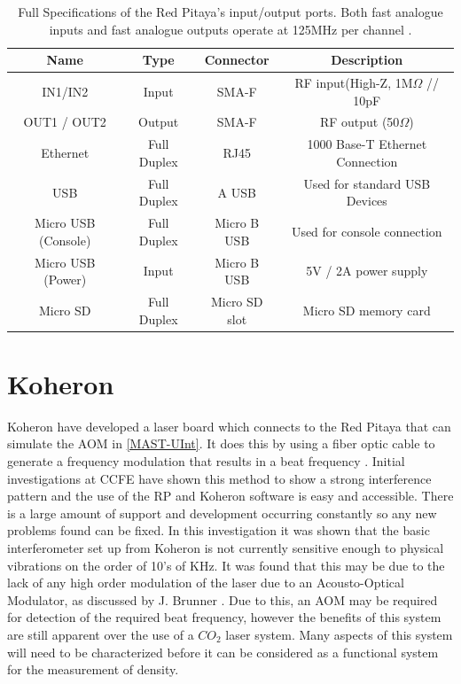 \documentclass[12pt,a4paper,oneside]{report}
\begin{document}
\begin{table}[H]
	\setlength\arrayrulewidth{1pt}
    \begin{tabular}{ c c c c } 
        Name & Type & Connector & Description\\
        \hline
        IN1/IN2 & Input & SMA-F & RF input(High-Z, 1M$\Omega$ // 10pF\\[1pt]
        OUT1 / OUT2 & Output & SMA-F & RF output (50$\Omega$)\\[1pt]
        Ethernet & Full Duplex & RJ45 & 1000 Base-T Ethernet Connection\\[1pt]
        USB & Full Duplex & A USB & Used for standard USB Devices\\[1pt]
        Micro USB (Console) & Full Duplex & Micro B USB & Used for console connection\\[1pt]
        Micro USB (Power) & Input & Micro B USB & 5V / 2A power supply\\[1pt]
        Micro SD & Full Duplex & Micro SD slot & Micro SD memory card\\
    \end{tabular}
    \caption{Full Specifications of the Red Pitaya's input/output ports. Both fast analogue inputs and fast analogue outputs operate at 125MHz per channel \cite[p.~7]{Leban2014RedManual}.}
    \label{RPspec}
\end{table}

\section{Koheron} 
Koheron have developed a laser board which connects to the Red Pitaya that can simulate the AOM in \autoref{MAST-UInt}. It does this by using a fiber optic cable to generate a frequency modulation that results in a beat frequency \cite{KoheronAmplitudeKoheron}. Initial investigations at CCFE \cite{Hickling2017InvestigationMAST-U} have shown this method to show a strong interference pattern and the use of the RP and Koheron software is easy and accessible. There is a large amount of support and development occurring constantly so any new problems found can be fixed. In this investigation it was shown that the basic interferometer set up from Koheron is not currently sensitive enough to physical vibrations on the order of 10's of KHz. It was found that this may be due to the lack of any high order modulation of the laser due to an Acousto-Optical Modulator, as discussed by J. Brunner \cite[p. ~29]{Brunner2017}. Due to this, an AOM may be required for detection of the required beat frequency, however the benefits of this system are still apparent over the use of a $CO_{2}$ laser system. Many aspects of this system will need to be characterized before it can be considered as a functional system for the measurement of density.
\end{document}
